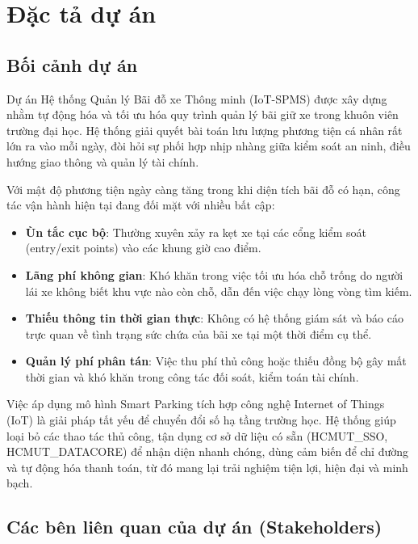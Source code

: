 \newpage
\section{Đặc tả dự án}
\subsection{Bối cảnh dự án}

Dự án Hệ thống Quản lý Bãi đỗ xe Thông minh (IoT-SPMS) được xây dựng nhằm tự động hóa và tối ưu hóa quy trình quản lý bãi giữ xe trong khuôn viên trường đại học. Hệ thống giải quyết bài toán lưu lượng phương tiện cá nhân rất lớn ra vào mỗi ngày, đòi hỏi sự phối hợp nhịp nhàng giữa kiểm soát an ninh, điều hướng giao thông và quản lý tài chính.

Với mật độ phương tiện ngày càng tăng trong khi diện tích bãi đỗ có hạn, công tác vận hành hiện tại đang đối mặt với nhiều bất cập:
\begin{itemize}
    \item \textbf{Ùn tắc cục bộ}: Thường xuyên xảy ra kẹt xe tại các cổng kiểm soát (entry/exit points) vào các khung giờ cao điểm.
    \item \textbf{Lãng phí không gian}: Khó khăn trong việc tối ưu hóa chỗ trống do người lái xe không biết khu vực nào còn chỗ, dẫn đến việc chạy lòng vòng tìm kiếm.
    \item \textbf{Thiếu thông tin thời gian thực}: Không có hệ thống giám sát và báo cáo trực quan về tình trạng sức chứa của bãi xe tại một thời điểm cụ thể.
    \item \textbf{Quản lý phí phân tán}: Việc thu phí thủ công hoặc thiếu đồng bộ gây mất thời gian và khó khăn trong công tác đối soát, kiểm toán tài chính.
\end{itemize}

Việc áp dụng mô hình Smart Parking tích hợp công nghệ Internet of Things (IoT) là giải pháp tất yếu để chuyển đổi số hạ tầng trường học. Hệ thống giúp loại bỏ các thao tác thủ công, tận dụng cơ sở dữ liệu có sẵn (HCMUT\_SSO, HCMUT\_DATACORE) để nhận diện nhanh chóng, dùng cảm biến để chỉ đường và tự động hóa thanh toán, từ đó mang lại trải nghiệm tiện lợi, hiện đại và minh bạch.

\subsection{Các bên liên quan của dự án (Stakeholders)}

